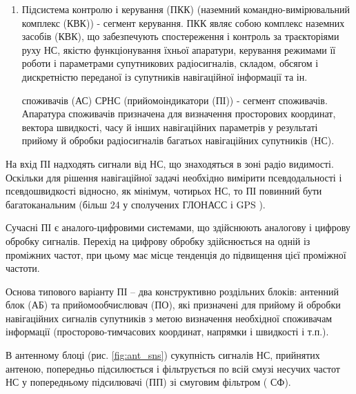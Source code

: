 \begin{enumerate}

 космічних апаратів (ПКА), що складається з навігаційних супутників (НС) 
(мережа навігаційних супутників - космічний сегмент). ПКА СРНС складається з визначеного 
числа навігаційних супутників. Основні функції НС --- формування і випромінювання 
радіосигналів, необхідних для навігаційних визначень споживачів СРНС, контролю бортових 
систем супутника підсистемою контролю і керування СРНС. Відповідні характеристики сигналів 
НС і способи їхньої обробки дозволяють проводити навігаційні виміри з високою точністю.

 \item Підсистема контролю і керування (ПКК) (наземний командно-вимірювальний комплекс (КВК)) - 
сегмент керування. ПКК являє собою комплекс наземних засобів (КВК), що забезпечують 
спостереження і контроль за траєкторіями руху НС, якістю функціонування їхньої апаратури, 
керування режимами її роботи і параметрами супутникових радіосигналів, складом, обсягом і 
дискретністю переданої із супутників навігаційної інформації та ін.

  споживачів (АС) СРНС (прийомоіндикатори (ПІ)) - сегмент споживачів.
Апаратура споживачів призначена для визначення просторових координат, вектора швидкості, 
часу й інших навігаційних параметрів у результаті прийому й обробки радіосигналів багатьох 
навігаційних супутників (НС).

\end{enumerate}
На вхід ПІ надходять сигнали від НС, що знаходяться в зоні радіо видимості. Оскільки для 
рішення навігаційної задачі необхідно вимірити псевдодальності і псевдошвидкості відносно, 
як мінімум, чотирьох НС, то ПІ повинний бути багатоканальним (більш 24 у сполучених ГЛОНАСС і GPS ).

Сучасні ПІ є аналого-цифровими системами, що здійснюють аналогову і цифрову обробку 
сигналів. Перехід на цифрову обробку здійснюється на одній із проміжних частот, при 
цьому має місце тенденція до підвищення цієї проміжної частоти.

Основа типового варіанту ПІ -- два конструктивно роздільних блоків: антенний блок (АБ) та 
прийомообчислювач (ПО), які призначені для прийому й обробки навігаційних сигналів 
супутників з метою визначення необхідної споживачам інформації (просторово-тимчасових 
координат, напрямки і швидкості і т.п.).

В антенному блоці (рис. \ref{fig:ant_sns}) сукупність сигналів НС, прийнятих антеною, попередньо 
підсилюється і фільтрується по всій смузі несучих частот НС у попередньому підсилювачі 
(ПП) зі смуговим фільтром ( СФ). 

